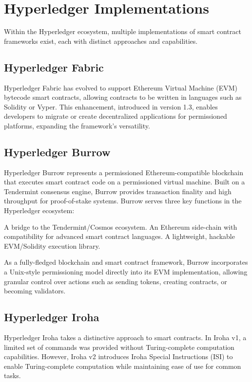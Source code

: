 \documentclass{article}
\begin{document}
\section{Hyperledger Implementations}

Within the Hyperledger ecosystem, multiple implementations of smart contract frameworks exist, each with distinct approaches and capabilities.

\subsection{Hyperledger Fabric}

Hyperledger Fabric has evolved to support Ethereum Virtual Machine (EVM) bytecode smart contracts, allowing contracts to be written in languages such as Solidity or Vyper. This enhancement, introduced in version 1.3, enables developers to migrate or create decentralized applications for permissioned platforms, expanding the framework's versatility\cite{hyperledger2018fabric}.

\subsection{Hyperledger Burrow}

Hyperledger Burrow represents a permissioned Ethereum-compatible blockchain that executes smart contract code on a permissioned virtual machine. Built on a Tendermint consensus engine, Burrow provides transaction finality and high throughput for proof-of-stake systems. Burrow serves three key functions in the Hyperledger ecosystem:

A bridge to the Tendermint/Cosmos ecosystem. An Ethereum side-chain with compatibility for advanced smart contract languages. A lightweight, hackable EVM/Solidity execution library\cite{hyperledger2019burrow}.

As a fully-fledged blockchain and smart contract framework, Burrow incorporates a Unix-style permissioning model directly into its EVM implementation, allowing granular control over actions such as sending tokens, creating contracts, or becoming validators\cite{monax2020burrow}.

\subsection{Hyperledger Iroha}

Hyperledger Iroha takes a distinctive approach to smart contracts. In Iroha v1, a limited set of commands was provided without Turing-complete computation capabilities. However, Iroha v2 introduces Iroha Special Instructions (ISI) to enable Turing-complete computation while maintaining ease of use for common tasks.
\end{document}
